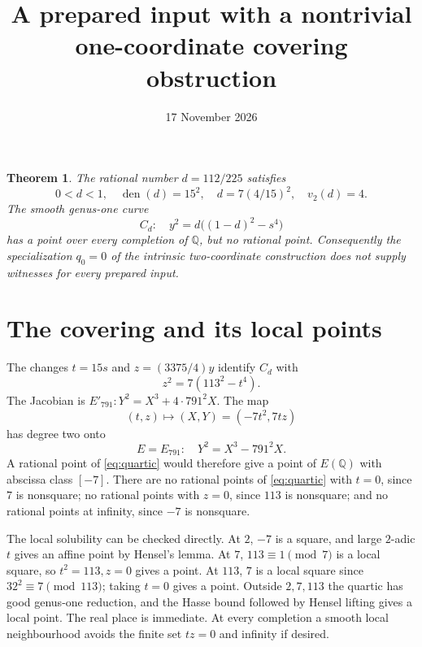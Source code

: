 \documentclass[11pt,a4paper]{article}
\newtheorem{theorem}{Theorem}
\newcommand{\Q}{\mathbb Q}
\begin{document}
\title{A prepared input with a nontrivial one-coordinate covering obstruction}
\author{}\date{17 November 2026}\maketitle

\begin{theorem}\label{thm:main}
The rational number $d=112/225$ satisfies
\[
 0<d<1,\quad\operatorname{den}(d)=15^2,\quad
 d=7(4/15)^2,\quad v_2(d)=4.
\]
The smooth genus-one curve
\[
 C_d:\quad y^2=d\bigl((1-d)^2-s^4\bigr)
\]
has a point over every completion of $\Q$, but no rational point. Consequently the specialization $q_0=0$ of the intrinsic two-coordinate construction does not supply witnesses for every prepared input.
\end{theorem}

\section{The covering and its local points}
The changes $t=15s$ and $z=(3375/4)y$ identify $C_d$ with
\begin{equation}\label{eq:quartic}
 z^2=7(113^2-t^4).
\end{equation}
The Jacobian is $E'_{791}:Y^2=X^3+4\cdot791^2X$.
The map
\begin{equation}\label{eq:cover}
 (t,z)\longmapsto(X,Y)=(-7t^2,7tz)
\end{equation}
has degree two onto
\[
 E=E_{791}:\quad Y^2=X^3-791^2X.
\]
A rational point of \eqref{eq:quartic} would therefore give a point of $E(\Q)$ with abscissa class $[-7]$. There are no rational points of \eqref{eq:quartic} with $t=0$, since $7$ is nonsquare; no rational points with $z=0$, since $113$ is nonsquare; and no rational points at infinity, since $-7$ is nonsquare.

The local solubility can be checked directly. At $2$, $-7$ is a square, and large $2$-adic $t$ gives an affine point by Hensel's lemma. At $7$, $113\equiv1\pmod7$ is a local square, so $t^2=113,z=0$ gives a point. At $113$, $7$ is a local square since $32^2\equiv7\pmod{113}$; taking $t=0$ gives a point. Outside $2,7,113$ the quartic has good genus-one reduction, and the Hasse bound followed by Hensel lifting gives a local point. The real place is immediate. At every completion a smooth local neighbourhood avoids the finite set $tz=0$ and infinity if desired.
\end{document}

